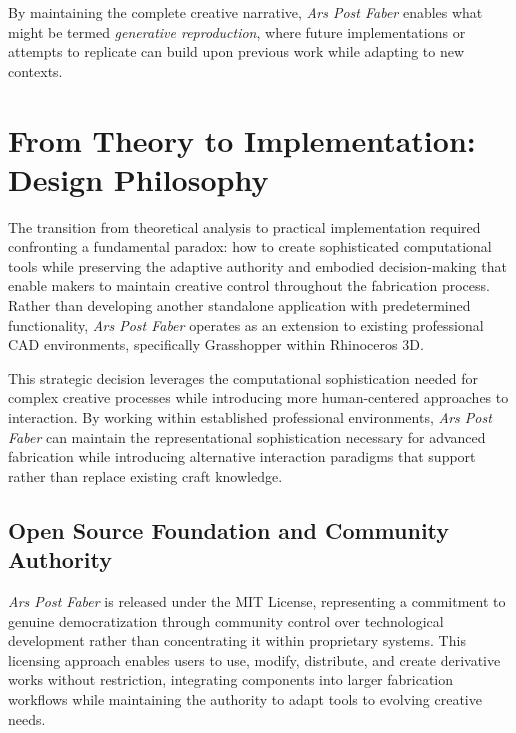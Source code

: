 \vspace{0.5cm}

By maintaining the complete creative narrative, \textit{Ars Post Faber} enables what might be termed \textit{generative reproduction}, where future implementations or attempts to replicate can build upon previous work while adapting to new contexts.

\section{From Theory to Implementation: Design Philosophy}

The transition from theoretical analysis to practical implementation required confronting a fundamental paradox: how to create sophisticated computational tools while preserving the adaptive authority and embodied decision-making that enable makers to maintain creative control throughout the fabrication process. Rather than developing another standalone application with predetermined functionality, \textit{Ars Post Faber} operates as an extension to existing professional CAD environments, specifically Grasshopper within Rhinoceros 3D.

\vspace{0.5cm}

This strategic decision leverages the computational sophistication needed for complex creative processes while introducing more human-centered approaches to interaction. By working within established professional environments, \textit{Ars Post Faber} can maintain the representational sophistication necessary for advanced fabrication while introducing alternative interaction paradigms that support rather than replace existing craft knowledge.

\subsection{Open Source Foundation and Community Authority}

\textit{Ars Post Faber} is released under the MIT License, representing a commitment to genuine democratization through community control over technological development rather than concentrating it within proprietary systems. This licensing approach enables users to use, modify, distribute, and create derivative works without restriction, integrating components into larger fabrication workflows while maintaining the authority to adapt tools to evolving creative needs.

\vspace{0.5cm}

